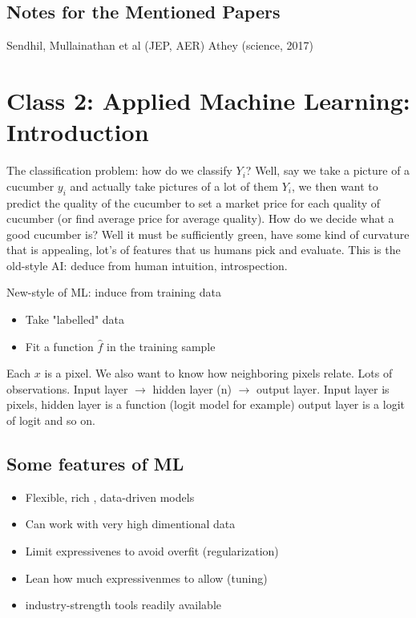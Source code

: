 \documentclass{article}
\begin{document}
\subsection{Notes for the Mentioned Papers }
Sendhil, Mullainathan et al (JEP, AER) 
Athey (science, 2017)

\section{Class 2: Applied Machine Learning: Introduction}

The classification problem: how do we classify $Y_i$? Well, say we take a picture of a cucumber $y_i$ and actually take pictures of a lot of them $Y_i$, we then want to predict the quality of the cucumber to set a market price for each quality of cucumber (or find average price for average quality). How do we decide what a good cucumber is? Well it must be sufficiently green, have some kind of curvature that is appealing, lot's of features that us humans pick and evaluate. This is the old-style AI: deduce from human intuition, introspection.

New-style of ML: induce from training data
\begin{itemize}
    \item Take "labelled" data
    \item Fit a function $\hat{f}$ in the training sample
\end{itemize}

Each $x$ is a pixel. We also want to know how neighboring pixels relate. Lots of observations. Input layer $\rightarrow$ hidden layer (n) $\rightarrow$ output layer. Input layer is pixels, hidden layer is a function (logit model for example) output layer is a logit of logit and so on.

\subsection{Some features of ML}

\begin{itemize}
    \item Flexible, rich , data-driven models
    \item Can work with very high dimentional data
    \item Limit expressivenes to avoid overfit (regularization)
    \item Lean how much expressivenmes to allow (tuning)
    \item industry-strength tools readily available
\end{itemize}
\end{document}
